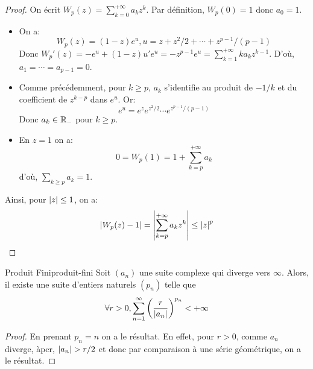 \documentclass{cours}
\begin{document}
\begin{proof}
	On écrit $W_{p}(z) = \sum_{k = 0}^{+\infty} a_{k}z^{k}$. Par définition, $W_{p}(0) = 1$ donc $a_{0} = 1$.
	\begin{itemize}
		\item On a: 
			\begin{equation*}
				W_{p}(z) = (1- z)e^{u}, u = z + z^{2}/2 + \cdots + z^{p - 1}/(p - 1)
			\end{equation*}
			Donc $W_{p}'(z) = -e^{u} + (1 - z)u'e^{u} = -z^{p - 1}e^{u} = \sum_{k = 1}^{+ \infty}ka_{k}z^{k - 1}$. D'où, $a_{1} = \cdots = a_{p - 1} = 0$.
		\item Comme précédemment, pour $k \geq p$, $a_{k}$ s'identifie au produit de $-1/k$ et du coefficient de $z^{k - p}$ dans $e^{u}$. Or: 
			\begin{equation*}
				e^{u} = e^{z}e^{z^{2}/2}\cdots e^{z^{p- 1}/(p-1)}
			\end{equation*}
			Donc $a_{k} \in \mathbb{R}_{-}$ pour $k \geq p$. 
		\item En $z = 1$ on a: 
			\begin{equation*}
				0 = W_{p}(1) = 1 + \sum_{k = p}^{+\infty}a_{k}
			\end{equation*}
			d'où, $\sum_{k \geq p} a_{k} = 1$. 
	\end{itemize}
	Ainsi, pour $\left|z\right|\leq 1$, on a: 
	\begin{equation*}
		\left|W_{p}(z) - 1\right| = \left|\sum_{k = p}^{+ \infty} a_{k}z^{k}\right| \leq \left|z\right|^{p}
	\end{equation*}
\end{proof}

\begin{lemme}
	{Produit Fini}{produit-fini}
	Soit $(a_{n})$ une suite complexe qui diverge vers $\infty$. Alors, il existe une suite d'entiers naturels $(p_{n})$ telle que 
	\begin{equation*}
		\forall r > 0, \sum_{n = 1}^{\infty}\left(\frac{r}{\left|a_{n}\right|}\right)^{p_{n}}  < + \infty
	\end{equation*}
\end{lemme}
\begin{proof}
	En prenant $p_{n} = n$ on a le résultat. En effet, pour $r > 0$, comme $a_{n}$ diverge, àpcr, $\left|a_{n}\right| > r/2$ et donc par comparaison à une série géométrique, on a le résultat. 
\end{proof}
\end{document}
